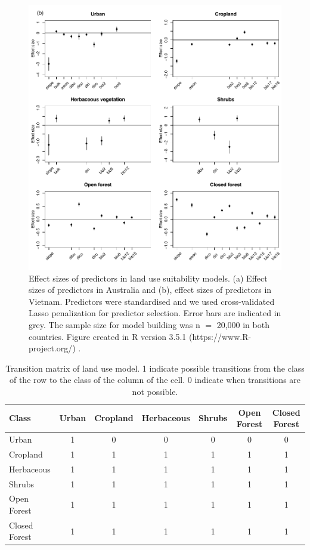 \documentclass[titlesmallcaps,copyrightpage]{uomthesis}\usepackage[]{graphicx}\usepackage[]{color}
\begin{document}
\begin{figure}[htb]
\continuedfloat
\centering
\includegraphics[width=1\linewidth]{chapters/figures/chapter2/supfig3b.pdf}
\caption{Effect sizes of predictors in land use suitability models. (a) Effect sizes of predictors in Australia and (b), effect sizes of predictors in Vietnam. Predictors were standardised and we used cross-validated Lasso penalization for predictor selection. Error bars are indicated in grey. The sample size for model building was n $=$ 20,000 in both countries. Figure created in R version 3.5.1 (https://www.R-project.org/) \citep{r_development_core_team_r_2008}.}
\end{figure}%

\begin{table}[htb]
\centering
\caption{Transition matrix of land use model. 1 indicate possible transitions from the class of the row to the class of the column of the cell. 0 indicate when transitions are not possible.}
\label{apx:ch2:tab4}
\begin{tabularx}{0.8\textwidth}{@{}lcccccc@{}}
\toprule
Class & Urban & Cropland & Herbaceous & Shrubs & Open Forest & Closed Forest \\ \bottomrule
Urban & 1 & 0 & 0 & 0 & 0 & 0 \\
Cropland & 1 & 1 & 1 & 1 & 1 & 1 \\
Herbaceous & 1 & 1 & 1 & 1 & 1 & 1 \\
Shrubs & 1 & 1 & 1 & 1 & 1 & 1 \\
Open Forest & 1 & 1 & 1 & 1 & 1 & 1 \\
Closed Forest & 1 & 1 & 1 & 1 & 1 & 1 \\ \bottomrule
\end{tabularx}
\end{table}
\end{document}

